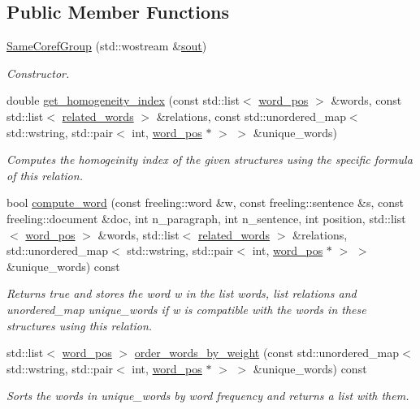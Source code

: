 \subsection*{Public Member Functions}
\begin{DoxyCompactItemize}
\item 
\hyperlink{classSameCorefGroup_aa38679729573a9800ecbaa1650ca2458}{Same\+Coref\+Group} (std\+::wostream \&\hyperlink{classRelation_a44deec0ee05d803ea23e14520fd57a75}{sout})
\begin{DoxyCompactList}\small\item\em Constructor. \end{DoxyCompactList}\item 
double \hyperlink{classSameCorefGroup_a7b6e236b68a30f2b24e5838af6c16a7b}{get\+\_\+homogeneity\+\_\+index} (const std\+::list$<$ \hyperlink{structword__pos}{word\+\_\+pos} $>$ \&words, const std\+::list$<$ \hyperlink{structrelated__words}{related\+\_\+words} $>$ \&relations, const std\+::unordered\+\_\+map$<$ std\+::wstring, std\+::pair$<$ int, \hyperlink{structword__pos}{word\+\_\+pos} $\ast$ $>$ $>$ \&unique\+\_\+words)
\begin{DoxyCompactList}\small\item\em Computes the homogeinity index of the given structures using the specific formula of this relation. \end{DoxyCompactList}\item 
bool \hyperlink{classSameCorefGroup_a6e2b2784fbac185dc16af242280ff082}{compute\+\_\+word} (const freeling\+::word \&w, const freeling\+::sentence \&s, const freeling\+::document \&doc, int n\+\_\+paragraph, int n\+\_\+sentence, int position, std\+::list$<$ \hyperlink{structword__pos}{word\+\_\+pos} $>$ \&words, std\+::list$<$ \hyperlink{structrelated__words}{related\+\_\+words} $>$ \&relations, std\+::unordered\+\_\+map$<$ std\+::wstring, std\+::pair$<$ int, \hyperlink{structword__pos}{word\+\_\+pos} $\ast$ $>$ $>$ \&unique\+\_\+words) const 
\begin{DoxyCompactList}\small\item\em Returns true and stores the word w in the list words, list relations and unordered\+\_\+map unique\+\_\+words if w is compatible with the words in these structures using this relation. \end{DoxyCompactList}\item 
std\+::list$<$ \hyperlink{structword__pos}{word\+\_\+pos} $>$ \hyperlink{classSameCorefGroup_a44e442d53523999350cbb37cb40918f4}{order\+\_\+words\+\_\+by\+\_\+weight} (const std\+::unordered\+\_\+map$<$ std\+::wstring, std\+::pair$<$ int, \hyperlink{structword__pos}{word\+\_\+pos} $\ast$ $>$ $>$ \&unique\+\_\+words) const 
\begin{DoxyCompactList}\small\item\em Sorts the words in unique\+\_\+words by word frequency and returns a list with them. \end{DoxyCompactList}\end{DoxyCompactItemize}
